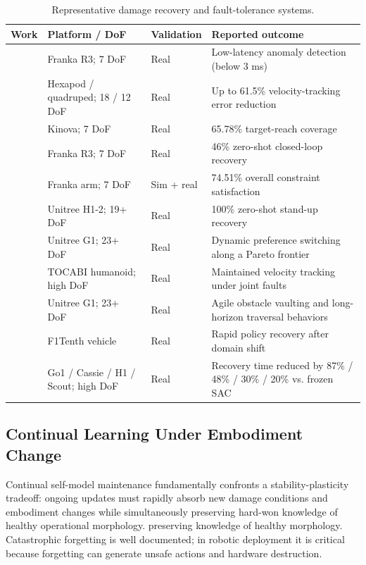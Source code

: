 ﻿\documentclass[11pt,a4paper]{article}
\begin{document}
\begin{table}[htbp]
\centering
\caption{Representative damage recovery and fault-tolerance systems.}
\label{tab:damage_recovery_methods}
\renewcommand{\arraystretch}{1.2}
\small
\begin{tabularx}{\textwidth}{@{}p{2.8cm}p{3.5cm}p{2.0cm}X@{}}
\toprule
Work & Platform / DoF & Validation & Reported outcome \\
\midrule
\cite{grambow2026anomaly} & Franka R3; 7 DoF & Real & Low-latency anomaly detection (below 3 ms) \\
\cite{fu2025contrastive} & Hexapod / quadruped; 18 / 12 DoF & Real & Up to 61.5\% velocity-tracking error reduction \\
\cite{chen2024vlm} & Kinova; 7 DoF & Real & 65.78\% target-reach coverage \\
\cite{li2025dream2fix} & Franka R3; 7 DoF & Real & 46\% zero-shot closed-loop recovery \\
\cite{briscoe2025deft} & Franka arm; 7 DoF & Sim + real & 74.51\% overall constraint satisfaction \\
\cite{poddar2026embedding} & Unitree H1-2; 19+ DoF & Real & 100\% zero-shot stand-up recovery \\
\cite{li2026pchc} & Unitree G1; 23+ DoF & Real & Dynamic preference switching along a Pareto frontier \\
\cite{lee2026tolebi} & TOCABI humanoid; high DoF & Real & Maintained velocity tracking under joint faults \\
\cite{wu2026parkour} & Unitree G1; 23+ DoF & Real & Agile obstacle vaulting and long-horizon traversal behaviors \\
\cite{domberg2026selfadapting} & F1Tenth vehicle & Real & Rapid policy recovery after domain shift \\
\cite{jayasinghe2026residual} & Go1 / Cassie / H1 / Scout; high DoF & Real & Recovery time reduced by 87\% / 48\% / 30\% / 20\% vs. frozen SAC \\
\bottomrule
\end{tabularx}
\end{table}

\subsection{Continual Learning Under Embodiment Change}

Continual self-model maintenance fundamentally confronts a stability-plasticity tradeoff: ongoing updates must rapidly absorb new damage conditions and embodiment changes while simultaneously preserving hard-won knowledge of healthy operational morphology. preserving knowledge of healthy morphology. Catastrophic forgetting is well documented; in robotic deployment it is critical because forgetting can generate unsafe actions and hardware destruction.
\end{document}
